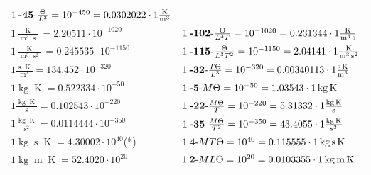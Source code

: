 \begin{center}
\begin{longtable}{l l}
	{\color{black}$1\:\text{\textbf{-45}-} \frac{\Theta}{L^3}=10^{-450} = 0.0302022 \cdot 1 \bm{\mathrm{ }}\frac{\operatorname{K}}{\operatorname{m}^3}$}\\
{\color{black}$1 \bm{\mathrm{ }}\frac{\operatorname{K}}{\operatorname{m}^3\operatorname{s}} = 2.20511\cdot10^{-1020} $}&
	{\color{black}$1\:\text{\textbf{-102}-} \frac{\Theta}{L^3T}=10^{-1020} = 0.231344 \cdot 1 \bm{\mathrm{ }}\frac{\operatorname{K}}{\operatorname{m}^3\operatorname{s}}$}\\
{\color{black}$1 \bm{\mathrm{ }}\frac{\operatorname{K}}{\operatorname{m}^3\operatorname{s}^2} = 0.245535\cdot10^{-1150} $}&
	{\color{black}$1\:\text{\textbf{-115}-} \frac{\Theta}{L^3T^2}=10^{-1150} = 2.04141 \cdot 1 \bm{\mathrm{ }}\frac{\operatorname{K}}{\operatorname{m}^3\operatorname{s}^2}$}\\
{\color{black}$1 \bm{\mathrm{ }}\frac{\operatorname{s}\operatorname{K}}{\operatorname{m}^3} = 134.452\cdot10^{-320} $}&
	{\color{black}$1\:\text{\textbf{-32}-} \frac{T\Theta}{L^3}=10^{-320} = 0.00340113 \cdot 1 \bm{\mathrm{ }}\frac{\operatorname{s}\operatorname{K}}{\operatorname{m}^3}$}\\
\hline{\color{black}$1 \bm{\mathrm{ }}\operatorname{kg}\operatorname{K} = 0.522334\cdot10^{-50} $}&
	{\color{black}$1\:\text{\textbf{-5}-} M\Theta=10^{-50} = 1.03543 \cdot 1 \bm{\mathrm{ }}\operatorname{kg}\operatorname{K}$}\\
{\color{black}$1 \bm{\mathrm{ }}\frac{\operatorname{kg}\operatorname{K}}{\operatorname{s}} = 0.102543\cdot10^{-220} $}&
	{\color{black}$1\:\text{\textbf{-22}-} \frac{M\Theta}{T}=10^{-220} = 5.31332 \cdot 1 \bm{\mathrm{ }}\frac{\operatorname{kg}\operatorname{K}}{\operatorname{s}}$}\\
{\color{black}$1 \bm{\mathrm{ }}\frac{\operatorname{kg}\operatorname{K}}{\operatorname{s}^2} = 0.0114444\cdot10^{-350} $}&
	{\color{black}$1\:\text{\textbf{-35}-} \frac{M\Theta}{T^2}=10^{-350} = 43.4055 \cdot 1 \bm{\mathrm{ }}\frac{\operatorname{kg}\operatorname{K}}{\operatorname{s}^2}$}\\
{\color{black}$1 \bm{\mathrm{ }}\operatorname{kg}\operatorname{s}\operatorname{K} = 4.30002\cdot10^{40} $}\quad(*)&
	{\color{black}$1\:\text{\textbf{4}-} MT\Theta=10^{40} = 0.115555 \cdot 1 \bm{\mathrm{ }}\operatorname{kg}\operatorname{s}\operatorname{K}$}\\
{\color{black}$1 \bm{\mathrm{ }}\operatorname{kg}\operatorname{m}\operatorname{K} = 52.4020\cdot10^{20} $}&
	{\color{black}$1\:\text{\textbf{2}-} ML\Theta=10^{20} = 0.0103355 \cdot 1 \bm{\mathrm{ }}\operatorname{kg}\operatorname{m}\operatorname{K}$}\\

\end{longtable}
\end{center}
